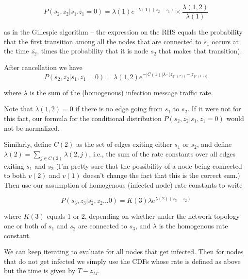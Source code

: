 \documentclass{article}
\begin{document}
\begin{equation}
P(s_2, \bar{z_2} | s_1. z_1 =0)  =
\lambda(1) e^{- \lambda(1) (\bar{z_2} - \bar{z_1})} 
\times \frac{\lambda(1,2)}{\lambda(1)}
\end{equation}

        as in the Gillespie algorithm -- the
	expression on the RHS equals the probability that the first transition
	among all the nodes that are connected to $s_1$ occurs at the time
	$\bar{z_2}$, times the probability that it is node $s_2$ that makes that
	transition). 
        
          

        After cancellation we have	
\begin{equation}
P(s_2, \bar{z_2} | s_1, \bar{z_1} = 0) =
\lambda(1, 2) e^{-|C(1)| \lambda \cdot (z_{\{v(2)\}} - z_{\{v(1))\}}}
\label{orig5}
\end{equation}

	where $\lambda$ is the sum of the (homogenous) infection message traffic rate. 

	Note that $\lambda(1, 2) = 0$ if there is no edge going from $s_1$ to
	$s_2$. If it were not for this fact, our formula for the conditional
	distribution $P(s_2, \bar{z_2} | s_1, \bar{z_1} = 0)$ would not be
	normalized.

	Similarly, define $C(2)$ as the set of edges exiting either $s_1$ or
	$s_2$, and define $\lambda(2) = \sum_{j \in C(2)} \lambda(2,j)$, i.e., the
	sum of the rate constants over all edges exiting $s_1$ and $s_2$ (I'm pretty
	sure that the possibility of a node being connected to both $v(2)$ and
	$v(1)$ doesn't change the fact that this is the correct sum.)  Then use
	our assumption of homogenous (infected node) rate constants to write

\begin{equation}
P(s_3, \bar{z_3} | s_2, \bar{z_2} ...0)  =  
K(3) \lambda e^{\lambda(2) (\bar{z_3} - \bar{z_2})} 
\end{equation}

	where $K(3)$ equals $1$ or $2$, depending on whether under the network
	topology one or both of $s_1$ and $s_2$ are connected to $s_3$, and
	$\lambda$ is the homogenous rate constant.

	We can keep iterating to evaluate for all nodes that get infected. Then for nodes that do 
        not get infected we simply use the CDFs whose rate is defined as above but the time
        is given by $T- z_M$.

\end{document}
